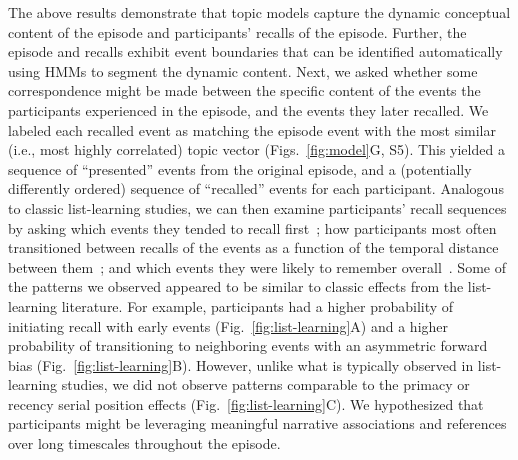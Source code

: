 \documentclass[10pt]{article}
\newcommand{\matchmats}{S5}
\begin{document}
The above results demonstrate that topic models capture the dynamic conceptual content of the episode and participants' recalls of the episode.  Further, the episode and recalls exhibit event boundaries that can be identified automatically using HMMs to segment the dynamic content.  Next, we asked whether some correspondence might be made between the specific content of the events the participants experienced in the episode, and the events they later recalled.  We labeled each recalled event as matching the episode event with the most similar (i.e., most highly correlated) topic vector (Figs.~\ref{fig:model}G, \matchmats).  This yielded a sequence of ``presented'' events from the original episode, and a (potentially differently ordered) sequence of ``recalled'' events for each participant.  Analogous to classic list-learning studies, we can then examine participants' recall sequences by asking which events they tended to recall first~\citep[probability of first recall; Fig.~\ref{fig:list-learning}A;][]{AtkiShif68, PostPhil65, WelcBurn24}; how participants most often transitioned between recalls of the events as a function of the temporal distance between them~\citep[lag-conditional response probability; Fig.~\ref{fig:list-learning}B;][]{Kaha96}; and which events they were likely to remember overall~\citep[serial position recall analyses; Fig.~\ref{fig:list-learning}C;][]{Murd62a}. Some of the patterns we observed appeared to be similar to classic effects from the list-learning literature.  For example, participants had a higher probability of initiating recall with early events (Fig.~\ref{fig:list-learning}A) and a higher probability of transitioning to neighboring events with an asymmetric forward bias (Fig.~\ref{fig:list-learning}B). However, unlike what is typically observed in list-learning studies, we did not observe patterns comparable to the primacy or recency serial position effects (Fig.~\ref{fig:list-learning}C).  We hypothesized that participants might be leveraging meaningful narrative associations and references over long timescales throughout the episode.
\end{document}
